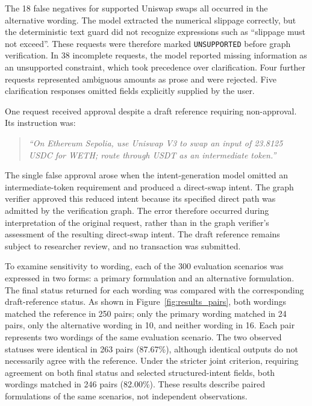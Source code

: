 The 18 false negatives for supported Uniswap swaps all occurred in the
alternative wording. The model extracted the numerical slippage correctly,
but the deterministic text guard did not recognize expressions such as
``slippage must not exceed''. These requests were therefore marked
\texttt{UNSUPPORTED} before graph verification. In 38 incomplete requests, the model reported missing information as
an unsupported constraint, which took precedence over clarification.
Four further requests represented ambiguous amounts as prose and were
rejected. Five clarification responses omitted fields explicitly supplied
by the user.

One request received approval despite a draft reference requiring
non-approval. Its instruction was:
\begin{quote}
\emph{``On Ethereum Sepolia, use Uniswap V3 to swap an input of
23.8125 USDC for WETH; route through USDT as an intermediate token.''}
\end{quote}
The single false approval arose when the intent-generation model omitted
an intermediate-token requirement and produced a direct-swap intent.
The graph verifier approved this reduced intent because its specified
direct path was admitted by the verification graph. The error therefore
occurred during interpretation of the original request, rather than in
the graph verifier's assessment of the resulting direct-swap intent.
The draft reference remains subject to researcher review, and no
transaction was submitted.

To examine sensitivity to wording, each of the 300 evaluation scenarios
was expressed in two forms: a primary formulation and an alternative
formulation. The final status returned for each wording was compared
with the corresponding draft-reference status. As shown in
Figure~\ref{fig:results_pairs}, both wordings matched the reference in
250 pairs; only the primary wording matched in 24 pairs, only the
alternative wording in 10, and neither wording in 16.  Each pair represents two wordings of the
same evaluation scenario. The two observed
statuses were identical in 263 pairs (87.67\%), although identical
outputs do not necessarily agree with the reference. Under the stricter
joint criterion, requiring agreement on both final status and selected
structured-intent fields, both wordings matched in 246 pairs (82.00\%).
These results describe paired formulations of the same scenarios, not
independent observations.

